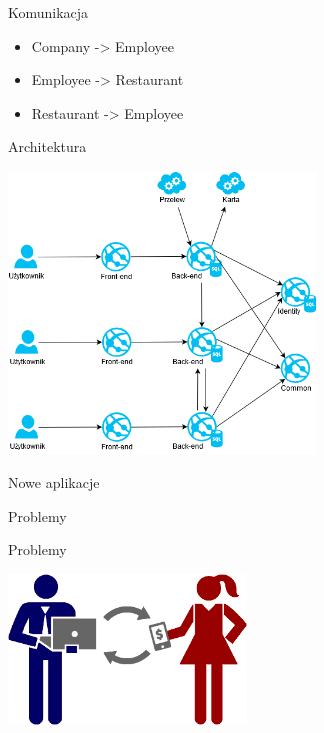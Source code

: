\documentclass{beamer}
\begin{document}
\begin{frame}{Komunikacja}
	\begin{huge}
		\begin{itemize}[<+->]
			\item Company -> Employee
			\item Employee -> Restaurant
			\item Restaurant -> Employee
		\end{itemize}
	\end{huge}
\end{frame}

\begin{frame}{Architektura}
	\begin{center}
		\includegraphics[height=7.5cm]{architektura3.png}
	\end{center}
\end{frame}

\begin{frame}{Nowe aplikacje}
	\begin{center}
		\Huge{Problemy}
	\end{center}
\end{frame}

\begin{frame}{Problemy}
	\begin{center}
		\includegraphics[height=4cm]{pay1.png}
	\end{center}
\end{frame}
\end{document}
